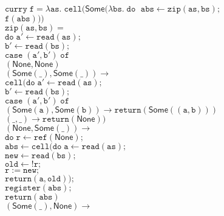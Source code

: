 \documentclass[preprint]{sigplanconf}
\newcommand{\term}[1]{\ensuremath{\mathtt{{#1}}}}
\newcommand{\None}{\mathsf{None}}
\newcommand{\Some}[1]{\mathsf{Some}({#1})}
\begin{document}
\begin{figure}
\begin{tabbing}
\term{curry\;f =\lambda as.\;cell(\mathsf{Some}(\lambda bs.\;do\;}
  \=\term{abs \leftarrow zip(as,bs);}\\
  \>\term{f(abs)))}
\\[1em]

\term{zip(as, bs) =} \\
\;\;\= \term{do\;}\=\term{a' \leftarrow read(as);} \\
\>              \>\term{b' \leftarrow read(bs);} \\
\>              \>\term{case \;(a',b')\;of}\\ 
\>           \>\;\;\=\term{(\None, \None)} \\
\>           \>    \>\term{(\Some{\_}, \Some{\_}) \to} \\
\>           \>    \> \qquad \term{cell(do\;}\=\term{a' \leftarrow read(as);} \\
\>           \>    \>                      \>\term{b' \leftarrow read(bs);} \\
\>           \>    \>                      \>\term{case \;(a',b')\; of} \\
\>           \>    \>                      \>\;\;\=\term{(\Some{a}, \Some{b}) \to return(\Some{(a,b)})} \\
\>           \>    \>                      \>\;\;\=\term{(\_, \_) \to return(\None))} \\
\>           \>    \>\term{(\None, \Some{\_}) \to}\\
\>           \>    \> \qquad\term{do\;}\=
                                      \term{r \leftarrow ref(\None);} \\
\>           \>    \>               \>\term{abs \leftarrow cell(do\;}\=\term{a \leftarrow read(as);} \\
\>           \>    \>               \>                               \>\term{new \leftarrow read(bs);} \\
\>           \>    \>               \>                               \>\term{old \leftarrow !r;}\\
\>           \>    \>               \>                               \>\term{r := new;}\\
\>           \>    \>               \>                               \>\term{return(a,old));}\\
\>           \>    \>               \>\term{register(abs);} \\
\>           \>    \>               \>\term{return(abs)} \\
\>           \>    \>\term{(\Some{\_}, \None) \to}\\

\end{tabbing}
\end{figure}
\end{document}
